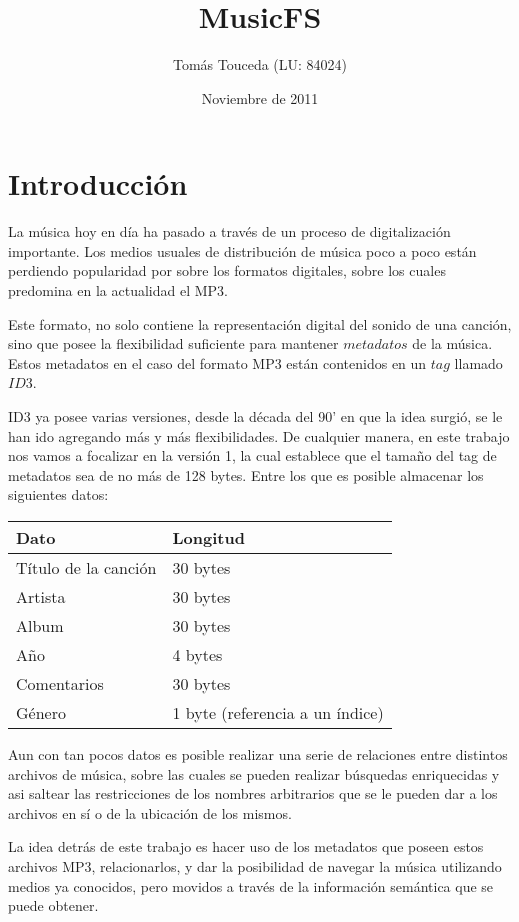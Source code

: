 \documentclass[a4paper,oneside]{report}
\title{MusicFS}
\author{Tomás Touceda (LU: 84024)}
\date{Noviembre de 2011}
\begin{document}
\maketitle
\tableofcontents

\chapter{Introducción}

La música hoy en día ha pasado a través de un proceso de digitalización importante. Los medios usuales de distribución de música poco a poco están perdiendo popularidad por sobre los formatos digitales, sobre los cuales predomina en la actualidad el MP3.

Este formato, no solo contiene la representación digital del sonido de una canción, sino que posee la flexibilidad suficiente para mantener $metadatos$ de la música. Estos metadatos en el caso del formato MP3 están contenidos en un $tag$ llamado $ID3$.

ID3 ya posee varias versiones, desde la década del 90' en que la idea surgió, se le han ido agregando más y más flexibilidades. De cualquier manera, en este trabajo nos vamos a focalizar en la versión 1, la cual establece que el tamaño del tag de metadatos sea de no más de 128 bytes. Entre los que es posible almacenar los siguientes datos:

\begin{center}
\begin{tabular}{ | l | l | }
  \hline
  Dato & Longitud \\ \hline
  Título de la canción & 30 bytes \\ \hline
  Artista & 30 bytes \\ \hline
  Album & 30 bytes \\ \hline
  Año & 4 bytes \\ \hline
  Comentarios & 30 bytes \\ \hline
  Género & 1 byte (referencia a un índice) \\ \hline
\end{tabular}
\end{center}


Aun con tan pocos datos es posible realizar una serie de relaciones entre distintos archivos de música, sobre las cuales se pueden realizar búsquedas enriquecidas y asi saltear las restricciones de los nombres arbitrarios que se le pueden dar a los archivos en sí o de la ubicación de los mismos.

La idea detrás de este trabajo es hacer uso de los metadatos que poseen estos archivos MP3, relacionarlos, y dar la posibilidad de navegar la música utilizando medios ya conocidos, pero movidos a través de la información semántica que se puede obtener.
\end{document}
